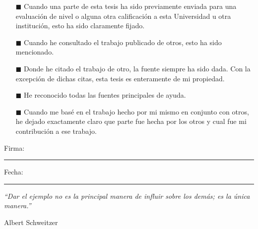 \documentclass[a4paper, 11pt, twoside]{Thesis}  %
\begin{document}
\begin{empfile}
{\begin{itemize}
\item[\tiny{$\blacksquare$}] Cuando una parte de esta tesis ha sido previamente enviada para una evaluación de nivel o alguna otra calificación a esta Universidad u otra institución, esto ha sido claramente fijado.
 
\item[\tiny{$\blacksquare$}] Cuando he consultado el trabajo publicado de otros, esto ha sido mencionado.
 
\item[\tiny{$\blacksquare$}] Donde he citado el trabajo de otro, la fuente siempre ha sido dada. Con la excepción de dichas citas, esta tesis es enteramente de mi propiedad.
 
\item[\tiny{$\blacksquare$}] He reconocido todas las fuentes principales de ayuda.
 
\item[\tiny{$\blacksquare$}] Cuando me basé en el trabajo hecho por mi mismo en conjunto con otros, he dejado exactamente claro que parte fue hecha por los otros y cual fue mi contribución a ese trabajo.
\\
\end{itemize}
 
 
Firma:\\
\rule[1em]{25em}{0.5pt}  %
 
Fecha:\\
\rule[1em]{25em}{0.5pt}  %
}
\clearpage  %

\pagestyle{empty}  %

\null\vfill
\textit{``Dar el ejemplo no es la principal manera de influir sobre los demás; es la única manera.''}

\begin{flushright}
Albert Schweitzer
\end{flushright}

\vfill\vfill\vfill\vfill\vfill\vfill\null
\clearpage  %

\end{empfile}
\end{document}

